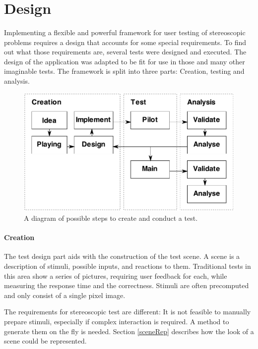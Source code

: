\section{Design\label{Design}}
\paragraph{}
Implementing a flexible and powerful framework for user testing of stereoscopic problems requires a design that accounts for some special requirements. To find out what those requirements are, several tests were designed and executed. The design of the application was adapted to be fit for use in those and many other imaginable tests.
The framework is split into three parts: Creation, testing and analysis.

\begin{figure}[htb]
\begin{center}
\includegraphics[width=15.5cm]{media/workflow.pdf}
\caption{A diagram of possible steps to create and conduct a test.\label{imgWorkflow}}
\end{center}
\end{figure}

\paragraph{Creation}
The test design part aids with the construction of the test scene. A scene is a description of stimuli, possible inputs, and reactions to them. Traditional tests in this area show a series of pictures, requiring user feedback for each, while measuring the response time and the correctness. Stimuli are often precomputed and only consist of a single pixel image.

The requirements for stereoscopic test are different: It is not feasible to manually prepare stimuli, especially if complex interaction is required.
A method to generate them on the fly is needed.
Section \ref{sceneRep} describes how the look of a scene could be represented.

